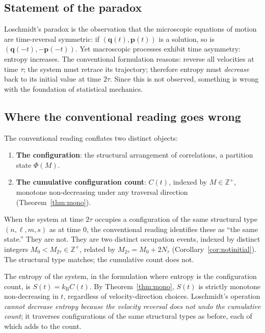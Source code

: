 \documentclass[twocolumn,10pt,a4paper]{article}
\theoremstyle{thmstyle}
\theoremstyle{definition}
\theoremstyle{remark}
\newcommand{\Zp}{\mathbb{Z}^{+}}
\newcommand{\PhiMap}{\varPhi}
\newcommand{\kB}{k_{\mathrm{B}}}
\begin{document}
\subsection{Statement of the paradox}

Loschmidt's paradox is the observation that the microscopic equations
of motion are time-reversal symmetric: if $(\mathbf{q}(t),\mathbf{p}(t))$
is a solution, so is $(\mathbf{q}(-t),-\mathbf{p}(-t))$. Yet macroscopic
processes exhibit time asymmetry: entropy increases. The conventional
formulation reasons: reverse all velocities at time $\tau$; the system
must retrace its trajectory; therefore entropy must \emph{decrease}
back to its initial value at time $2\tau$. Since this is not observed,
something is wrong with the foundation of statistical mechanics.

\subsection{Where the conventional reading goes wrong}

The conventional reading conflates two distinct objects:

\begin{enumerate}[nosep,leftmargin=*]
\item \textbf{The configuration}: the structural arrangement of
correlations, a partition state $\PhiMap(M)$.
\item \textbf{The cumulative configuration count}: $C(t)$, indexed by
$M\in\Zp$, monotone non-decreasing under any traversal direction
(Theorem~\ref{thm:mono}).
\end{enumerate}

When the system at time $2\tau$ occupies a configuration of the same
structural type $(n,\ell,m,s)$ as at time $0$, the conventional reading
identifies these as ``the same state.'' They are not. They are two
distinct occupation events, indexed by distinct integers
$M_{0}<M_{2\tau}\in\Zp$, related by $M_{2\tau}=M_{0}+2N_{\tau}$
(Corollary~\ref{cor:notinitial}). The structural type matches; the
cumulative count does not.

The entropy of the system, in the formulation where entropy is the
configuration count, is $S(t)=\kB C(t)$. By
Theorem~\ref{thm:mono}, $S(t)$ is strictly monotone non-decreasing
in $t$, regardless of velocity-direction choices. Loschmidt's
operation \emph{cannot decrease entropy because the velocity reversal
does not undo the cumulative count}; it traverses configurations of
the same structural types as before, each of which adds to the count.
\end{document}

